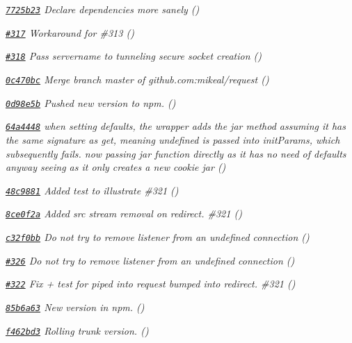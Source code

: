 \begin{DoxyItemize}
\item {\itshape \href{https://github.com/mikeal/request/commit/7725b235fdec8889c0c91d55c99992dc683e2e22}{\tt 7725b23} Declare dependencies more sanely ()}
\item {\itshape \href{https://github.com/mikeal/request/pull/317}{\tt \#317} Workaround for \#313 ()}
\item {\itshape \href{https://github.com/mikeal/request/pull/318}{\tt \#318} Pass servername to tunneling secure socket creation ()}
\item {\itshape \href{https://github.com/mikeal/request/commit/0c470bccf1ec097ae600b6116e6244cb624dc00e}{\tt 0c470bc} Merge branch \textquotesingle{}master\textquotesingle{} of github.\+com\+:mikeal/request ()}
\item {\itshape \href{https://github.com/mikeal/request/commit/0d98e5b7ea6bd9c4f21535d3682bbed2f2e05df4}{\tt 0d98e5b} Pushed new version to npm. ()}
\item {\itshape \href{https://github.com/mikeal/request/commit/64a44488ac8c792a1f548f305fc5c61efe0d77fb}{\tt 64a4448} when setting defaults, the wrapper adds the jar method assuming it has the same signature as get, meaning undefined is passed into init\+Params, which subsequently fails. now passing jar function directly as it has no need of defaults anyway seeing as it only creates a new cookie jar ()}
\item {\itshape \href{https://github.com/mikeal/request/commit/48c988118bda4691fffbfcf30d5a39b6c1438736}{\tt 48c9881} Added test to illustrate \#321 ()}
\item {\itshape \href{https://github.com/mikeal/request/commit/8ce0f2a3b6929cd0f7998e00d850eaf5401afdb7}{\tt 8ce0f2a} Added {\itshape src} stream removal on redirect. \#321 ()}
\item {\itshape \href{https://github.com/mikeal/request/commit/c32f0bb9feaa71917843856c23b4aae99f78ad4d}{\tt c32f0bb} Do not try to remove listener from an undefined connection ()}
\item {\itshape \href{https://github.com/mikeal/request/pull/326}{\tt \#326} Do not try to remove listener from an undefined connection ()}
\item {\itshape \href{https://github.com/mikeal/request/pull/322}{\tt \#322} Fix + test for piped into request bumped into redirect. \#321 ()}
\item {\itshape \href{https://github.com/mikeal/request/commit/85b6a632ac7d3456485fbf931043f10f5f6344a5}{\tt 85b6a63} New version in npm. ()}
\item {\itshape \href{https://github.com/mikeal/request/commit/f462bd3fa421fa5e5ca6c91852333db90297b80e}{\tt f462bd3} Rolling trunk version. ()}

\end{DoxyItemize}
